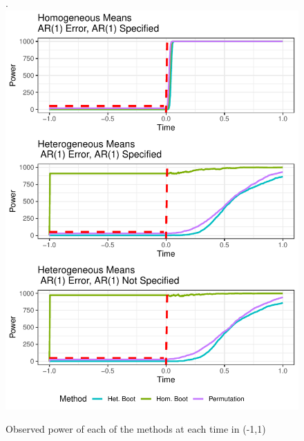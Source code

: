 \documentclass{article}
\begin{document}



\begin{figure}[H]
\centering.
\includegraphics{typeII_time.pdf}
\caption{Observed power of each of the methods at each time in (-1,1)}
\label{fig:time_power_plot}
\end{figure}

\end{document}
